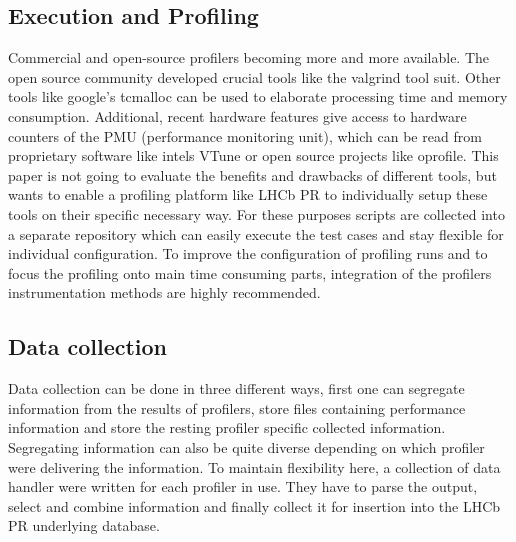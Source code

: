 \documentclass[a4paper]{jpconf}
\begin{document}
\subsection{Execution and Profiling}
\label{sec:execution_and_profiling}

Commercial and open-source profilers becoming more and more available. The open source community developed crucial tools like the valgrind tool suit. Other tools like google's tcmalloc can be used to elaborate processing time and memory consumption. Additional, recent hardware features give access to hardware counters of the PMU (performance monitoring unit), which can be read from proprietary software like intels VTune or open source projects like oprofile.
\newline
This paper is not going to evaluate the benefits and drawbacks of different tools, but wants to enable a profiling platform like LHCb PR to individually setup these tools on their specific necessary way. For these purposes scripts are collected into a separate repository which can easily execute the test cases and stay flexible for individual configuration. To improve the configuration of profiling runs and to focus the profiling onto main time consuming parts, integration of the profilers instrumentation methods are highly recommended.

\subsection{Data collection}
\label{sec:data_collection}

Data collection can be done in three different ways, first one can segregate information from the results of profilers, store files containing performance information and store the resting profiler specific collected information. Segregating information can also be quite diverse depending on which profiler were delivering the information. To maintain flexibility here, a collection of data handler were written for each profiler in use. They have to parse the output, select and combine information and finally collect it for insertion into the LHCb PR underlying database.  
\end{document}
